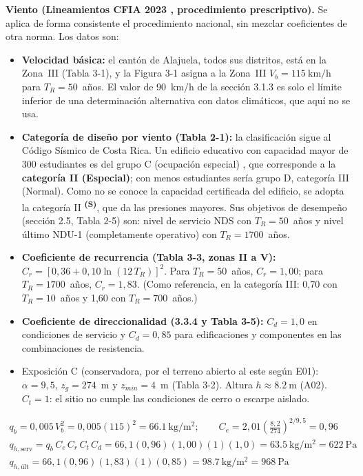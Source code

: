 \documentclass[12pt]{article}
\newcommand{\supuesto}{\textsuperscript{\textcolor{orange!80!black}{\textbf{(S)}}}}
\begin{document}
\textbf{Viento (Lineamientos CFIA 2023 \cite{cfiaViento}, procedimiento prescriptivo).} Se aplica de forma consistente el procedimiento nacional, sin mezclar coeficientes de otra norma. Los datos son:
\begin{itemize}
\item \textbf{Velocidad básica:} el cantón de Alajuela, todos sus distritos, está en la Zona~III (Tabla 3-1), y la Figura 3-1 asigna a la Zona~III $V_b=\SI{115}{\kilo\meter\per\hour}$ para $T_R=50$~años. El valor de 90~km/h de la sección 3.1.3 es solo el límite inferior de una determinación alternativa con datos climáticos, que aquí no se usa.
\item \textbf{Categoría de diseño por viento (Tabla 2-1):} la clasificación sigue al Código Sísmico de Costa Rica. Un edificio educativo con capacidad mayor de 300 estudiantes es del grupo C (ocupación especial) \cite{cscr2010}, que corresponde a la \textbf{categoría II (Especial)}; con menos estudiantes sería grupo D, categoría III (Normal). Como no se conoce la capacidad certificada del edificio, se adopta la categoría II \supuesto{}, que da las presiones mayores. Sus objetivos de desempeño (sección 2.5, Tabla 2-5) son: nivel de servicio NDS con $T_R=50$~años y nivel último NDU-1 (completamente operativo) con $T_R=1700$~años.
\item \textbf{Coeficiente de recurrencia (Tabla 3-3, zonas II a V):} $C_r=[0{,}36+0{,}10\ln(12\,T_R)]^2$. Para $T_R=50$~años, $C_r=1{,}00$; para $T_R=1700$~años, $C_r=1{,}83$. (Como referencia, en la categoría III: 0,70 con $T_R=10$~años y 1,60 con $T_R=700$~años.)
\item \textbf{Coeficiente de direccionalidad (3.3.4 y Tabla 3-5):} $C_d=1{,}0$ en condiciones de servicio y $C_d=0{,}85$ para edificaciones y componentes en las combinaciones de resistencia.
\item Exposición C (conservadora, por el terreno abierto al este según E01): $\alpha=9{,}5$, $z_g=274$~m y $z_{min}=4$~m (Tabla 3-2). Altura $h\approx\SI{8.2}{\meter}$ (A02). $C_t=1$: el sitio no cumple las condiciones de cerro o escarpe aislado.
\end{itemize}
\begin{gather}
q_b=0{,}005\,V_b^2=0{,}005(115)^2=\SI{66.1}{\kilo\gram\per\meter\squared};\qquad C_e=2{,}01\left(\tfrac{8{,}2}{274}\right)^{2/9{,}5}=0{,}96\\
q_{h,\text{serv}}=q_b\,C_e\,C_r\,C_t\,C_d=66{,}1(0{,}96)(1{,}00)(1)(1{,}0)=\SI{63.5}{\kilo\gram\per\meter\squared}=\SI{622}{\pascal}\\
q_{h,\text{últ}}=66{,}1(0{,}96)(1{,}83)(1)(0{,}85)=\SI{98.7}{\kilo\gram\per\meter\squared}=\SI{968}{\pascal}
\end{gather}
\end{document}
